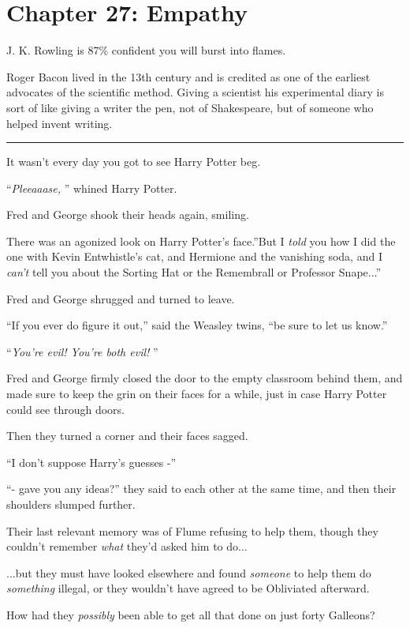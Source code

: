 \chapter{Chapter 27: Empathy}
J. K. Rowling is 87\% confident you will burst into flames.

Roger Bacon lived in the 13th century and is credited as one of the
earliest advocates of the scientific method. Giving a scientist his
experimental diary is sort of like giving a writer the pen, not of
Shakespeare, but of someone who helped invent writing.

\begin{center}\rule{3in}{0.4pt}\end{center}

It wasn't every day you got to see Harry Potter beg.

``\emph{Pleeaaase,} '' whined Harry Potter.

Fred and George shook their heads again, smiling.

There was an agonized look on Harry Potter's face.''But I \emph{told}
you how I did the one with Kevin Entwhistle's cat, and Hermione and the
vanishing soda, and I \emph{can't} tell you about the Sorting Hat or the
Remembrall or Professor Snape...''

Fred and George shrugged and turned to leave.

``If you ever do figure it out,'' said the Weasley twins, ``be sure to
let us know.''

``\emph{You're evil! You're both evil!} ''

Fred and George firmly closed the door to the empty classroom behind
them, and made sure to keep the grin on their faces for a while, just in
case Harry Potter could see through doors.

Then they turned a corner and their faces sagged.

``I don't suppose Harry's guesses -''

``- gave you any ideas?'' they said to each other at the same time, and
then their shoulders slumped further.

Their last relevant memory was of Flume refusing to help them, though
they couldn't remember \emph{what} they'd asked him to do...

...but they must have looked elsewhere and found \emph{someone} to
help them do \emph{something} illegal, or they wouldn't have agreed to
be Obliviated afterward.

How had they \emph{possibly} been able to get all that done on just
forty Galleons?

